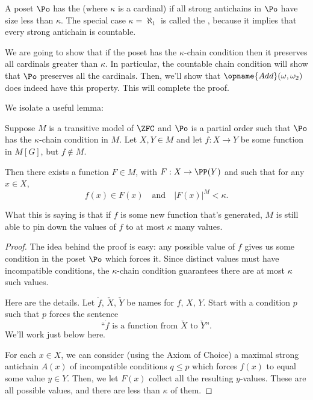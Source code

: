 \begin{definition}
	A poset $\Po$ has the 
	(where $\kappa$ is a cardinal) if all strong antichains
	in $\Po$ have size less than $\kappa$.
	The special case $\kappa = \aleph_1$ is called the ,
	because it implies that every strong antichain is countable.
\end{definition}

We are going to show that if the poset has the $\kappa$-chain condition
then it preserves all cardinals greater than $\kappa$.
In particular, the countable chain condition will show that $\Po$ preserves all the cardinals.
Then, we'll show that $\opname{Add}(\omega, \omega_2)$ does indeed have this property.
This will complete the proof.

We isolate a useful lemma:
\begin{lemma}
	Suppose $M$ is a transitive model of $\ZFC$ and $\Po$ is a partial order
	such that $\Po$ has the $\kappa$-chain condition in $M$.
	Let $X,Y \in M$ and let $f: X \to Y$
	be some function in $M[G]$, but $f \notin M$.

	Then there exists a function $F \in M$, with $F: X \to \PP(Y)$ and such that
	for any $x \in X$,
	\[ f(x) \in F(x) \quad\text{and}\quad \left\lvert F(x) \right\rvert^M < \kappa. \]
\end{lemma}
What this is saying is that if $f$ is some new function that's generated,
$M$ is still able to pin down the values of $f$ to at most $\kappa$ many values.

\begin{proof}
	The idea behind the proof is easy: any possible value of $f$ gives us some condition in
	the poset $\Po$ which forces it.
	Since distinct values must have incompatible conditions,
	the $\kappa$-chain condition guarantees
	there are at most $\kappa$ such values.

	Here are the details.
	Let $\dot f$, $\check X$, $\check Y$ be names for $f$, $X$, $Y$.
	Start with a condition $p$ such that $p$ forces the sentence
	\[ \text{``$\dot f$ is a function from $\check X$ to $\check Y$''}. \]
	We'll work just below here.

	For each $x \in X$, we can consider (using the Axiom of Choice) a maximal strong antichain $A(x)$
	of incompatible conditions $q \le p$ which forces $f(x)$ to equal some value $y \in Y$.
	Then, we let $F(x)$ collect all the resulting $y$-values.
	These are all possible values, and there are less than $\kappa$ of them.
\end{proof}

